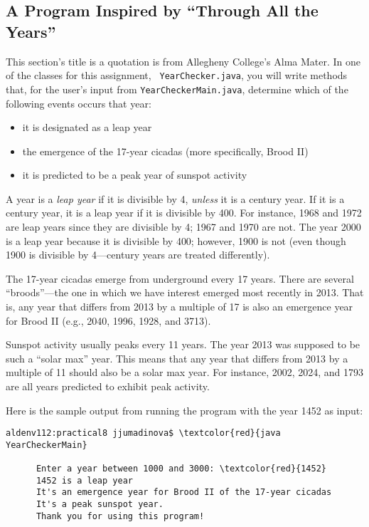 \subsection*{A Program Inspired by ``Through All the Years''}
\vspace*{-.05in}

This section's title is a quotation is from Allegheny College's Alma Mater. In one of the classes for this assignment, {\tt
YearChecker.java}, you will write methods that, for the user's input from {\tt YearCheckerMain.java}, determine which of
the following events occurs that year: \begin{itemize}

\item
it is designated as a leap year

\item
the emergence of the 17-year cicadas (more specifically, Brood II)

\item
it is predicted to be a peak year of sunspot activity

\end{itemize}

\noindent A year is a {\em leap year} if it is divisible by 4, {\em unless} it is a century year. If it is a century
year, it is a leap year if it is divisible by 400. For instance, 1968 and 1972 are leap years since they are divisible
by 4; 1967 and 1970 are not.  The year 2000 is a leap year because it is divisible by 400; however, 1900 is not (even
though 1900 is divisible by 4---century years are treated differently).

\noindent The 17-year cicadas emerge from underground every 17 years. There are several ``broods''---the one in which we
have interest emerged most recently in 2013. That is, any year that differs from 2013 by a multiple of 17 is also an
emergence year for Brood II (e.g., 2040, 1996, 1928, and 3713).

\noindent Sunspot activity usually peaks every 11 years. The year 2013 was supposed to be such a ``solar max'' year.
This means that any year that differs from 2013 by a multiple of 11 should also be a solar max year. For instance, 2002,
2024, and 1793 are all years predicted to exhibit peak activity.

\noindent Here is the sample output from running the program with the year 1452 as input:

\begin{Verbatim}[commandchars=\\\{\}]
      aldenv112:practical8 jjumadinova$ \textcolor{red}{java YearCheckerMain}

      Enter a year between 1000 and 3000: \textcolor{red}{1452}
      1452 is a leap year
      It's an emergence year for Brood II of the 17-year cicadas
      It's a peak sunspot year.
      Thank you for using this program!
\end{Verbatim}

